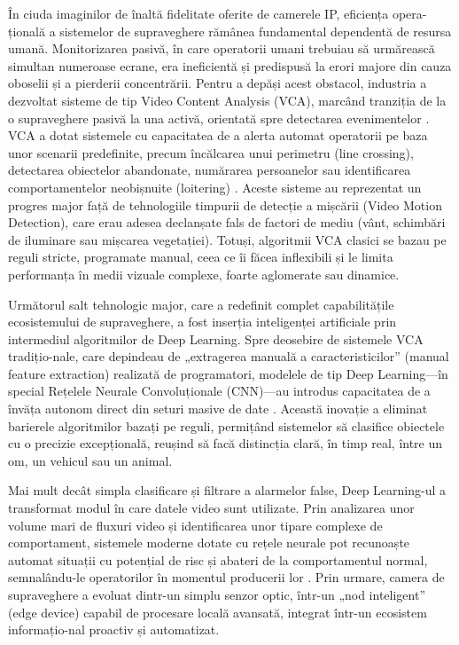 \documentclass[../../main.tex]{subfiles}
\begin{document}
În ciuda imaginilor de înaltă fidelitate oferite de camerele IP, eficiența opera-țională a sistemelor de supraveghere rămânea fundamental dependentă de resursa umană. Monitorizarea pasivă, în care operatorii umani trebuiau să urmărească simultan numeroase ecrane, era ineficientă și predispusă la erori majore din cauza oboselii și a pierderii concentrării. Pentru a depăși acest obstacol, industria a dezvoltat sisteme de tip Video Content Analysis (VCA), marcând tranziția de la o supraveghere pasivă la una activă, orientată spre detectarea evenimentelor \cite{vca_optimization}. VCA a dotat sistemele cu capacitatea de a alerta automat operatorii pe baza unor scenarii predefinite, precum încălcarea unui perimetru (line crossing), detectarea obiectelor abandonate, numărarea persoanelor sau identificarea comportamentelor neobișnuite (loitering) \cite{vca_response}. Aceste sisteme au reprezentat un progres major față de tehnologiile timpurii de detecție a mișcării (Video Motion Detection), care erau adesea declanșate fals de factori de mediu (vânt, schimbări de iluminare sau mișcarea vegetației). Totuși, algoritmii VCA clasici se bazau pe reguli stricte, programate manual, ceea ce îi făcea inflexibili și le limita performanța în medii vizuale complexe, foarte aglomerate sau dinamice.

Următorul salt tehnologic major, care a redefinit complet capabilitățile ecosistemului de supraveghere, a fost inserția inteligenței artificiale prin intermediul algoritmilor de Deep Learning. Spre deosebire de sistemele VCA tradițio-nale, care depindeau de „extragerea manuală a caracteristicilor” (manual feature extraction) realizată de programatori, modelele de tip Deep Learning---în special Rețelele Neurale Convoluționale (CNN)---au introdus capacitatea de a învăța autonom direct din seturi masive de date \cite{sreenu_durai}. Această inovație a eliminat barierele algoritmilor bazați pe reguli, permițând sistemelor să clasifice obiectele cu o precizie excepțională, reușind să facă distincția clară, în timp real, între un om, un vehicul sau un animal.

Mai mult decât simpla clasificare și filtrare a alarmelor false, Deep Learning-ul a transformat modul în care datele video sunt utilizate. Prin analizarea unor volume mari de fluxuri video și identificarea unor tipare complexe de comportament, sistemele moderne dotate cu rețele neurale pot recunoaște automat situații cu potențial de risc și abateri de la comportamentul normal, semnalându-le operatorilor în momentul producerii lor \cite{sreenu_durai}. Prin urmare, camera de supraveghere a evoluat dintr-un simplu senzor optic, într-un „nod inteligent” (edge device) capabil de procesare locală avansată, integrat într-un ecosistem informațio-nal proactiv și automatizat.
\end{document}

